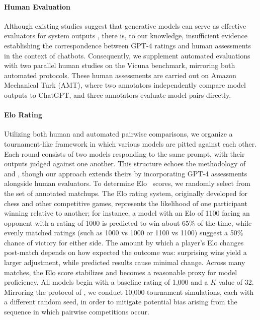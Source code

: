 \paragraph{Human Evaluation} Although existing studies suggest that generative models can serve as effective evaluators for system outputs \citep{fu2023gptscore}, there is, to our knowledge, insufficient evidence establishing the correspondence between GPT-4 ratings and human assessments in the context of chatbots. Consequently, we supplement automated evaluations with two parallel human studies on the Vicuna benchmark, mirroring both automated protocols. These human assessments are carried out on Amazon Mechanical Turk (AMT), where two annotators independently compare model outputs to ChatGPT, and three annotators evaluate model pairs directly.

\paragraph{Elo Rating} Utilizing both human and automated pairwise comparisons, we organize a tournament-like framework in which various models are pitted against each other. Each round consists of two models responding to the same prompt, with their outputs judged against one another. This structure echoes the methodology of \citet{bai2022training} and \citet{vicuna2023}, though our approach extends theirs by incorporating GPT-4 assessments alongside human evaluators. To determine Elo~\citep{elo1967proposed,elo1978rating} scores, we randomly select from the set of annotated matchups. The Elo rating system, originally developed for chess and other competitive games, represents the likelihood of one participant winning relative to another; for instance, a model with an Elo of 1100 facing an opponent with a rating of 1000 is predicted to win about 65\% of the time, while evenly matched ratings (such as 1000 vs 1000 or 1100 vs 1100) suggest a 50\% chance of victory for either side. The amount by which a player's Elo changes post-match depends on how expected the outcome was: surprising wins yield a larger adjustment, while predicted results cause minimal change. Across many matches, the Elo score stabilizes and becomes a reasonable proxy for model proficiency. All models begin with a baseline rating of 1,000 and a $K$ value of 32. Mirroring the protocol of \citet{vicuna2023}, we conduct 10,000 tournament simulations, each with a different random seed, in order to mitigate potential bias arising from the sequence in which pairwise competitions occur.

